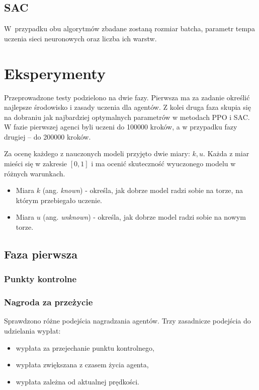 \documentclass[a4paper,12pt]{article}
\let\oldsection\section
\renewcommand\section{\clearpage\oldsection}
\begin{document}
\subsection{SAC}



W~przypadku obu algorytmów zbadane zostaną rozmiar batcha, parametr tempa uczenia sieci neuronowych oraz liczba ich warstw.

\section{Eksperymenty}
Przeprowadzone testy podzielono na dwie fazy. Pierwsza ma za zadanie określić najlepsze środowisko i zasady uczenia dla agentów. Z kolei druga faza skupia się na dobraniu jak najbardziej optymalnych parametrów w metodach PPO i SAC. W fazie pierwszej agenci byli uczeni do 100000 kroków, a w przypadku fazy drugiej -- do 200000 kroków.

Za ocenę każdego z nauczonych modeli przyjęto dwie miary: $k, u$. Każda z miar mieści się w zakresie $[0,1]$ i ma ocenić skuteczność wyuczonego modelu w różnych warunkach.
\begin{itemize}
	\item Miara $k$ (ang. \textit{known}) - określa, jak dobrze model radzi sobie na torze, na którym przebiegało uczenie.
	\item Miara $u$ (ang. \textit{unknown}) - określa, jak dobrze model radzi sobie na nowym torze. 
\end{itemize}


\subsection{Faza pierwsza}
\subsubsection{Punkty kontrolne}
\subsubsection{Nagroda za przeżycie}
Sprawdzono różne podejścia nagradzania agentów. Trzy zasadnicze podejścia do udzielania wypłat:
\begin{itemize}
	\item wypłata za przejechanie punktu kontrolnego,
	\item wypłata zwiększana z czasem życia agenta,
	\item wypłata zależna od aktualnej prędkości.
\end{itemize}
\end{document}
